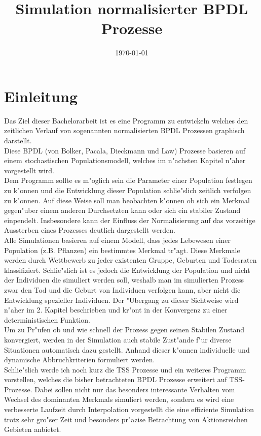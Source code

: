 \documentclass[11pt, a4paper, german]{article}
\date{\today}
\title{Simulation normalisierter BPDL Prozesse}
\begin{document}
\maketitle
\tableofcontents

\clearpage


\section{Einleitung}
Das Ziel dieser Bachelorarbeit ist es eine Programm zu entwickeln welches den zeitlichen Verlauf von sogenannten normalisierten BPDL Prozessen graphisch darstellt.\\
Diese BPDL (von Bolker, Pacala, Dieckmann und Law) Prozesse basieren auf einem stochastischen Populationsmodell, welches im n"achsten Kapitel n"aher vorgestellt wird. \\

Dem Programm sollte es m"oglich sein die Parameter einer Population festlegen zu k"onnen und die Entwicklung dieser Population schlie"slich zeitlich verfolgen zu k"onnen. Auf diese Weise soll man beobachten k"onnen ob sich ein Merkmal gegen"uber einem anderen Durchsetzten kann oder sich ein stabiler Zustand einpendelt. Insbesondere kann der Einfluss der Normalisierung auf das vorzeitige Aussterben eines Prozesses deutlich dargestellt werden.\\

Alle Simulationen basieren auf einem Modell, dass jedes Lebewesen einer Population (z.B. Pflanzen) ein bestimmtes Merkmal tr"agt. Diese Merkmale werden durch Wettbewerb zu jeder existenten Gruppe, Geburten und Todesraten klassifiziert. Schlie"slich ist es jedoch die Entwicklung der Population und nicht der Individuen die simuliert werden soll, weshalb man im simulierten Prozess zwar den Tod und die Geburt von Individuen verfolgen kann, aber nicht die Entwicklung spezieller Individuen. Der "Ubergang zu dieser Sichtweise wird n"aher im 2. Kapitel beschrieben und kr"ont in der Konvergenz zu einer deterministischen Funktion.\\

Um zu Pr"ufen ob und wie schnell der Prozess gegen seinen Stabilen Zustand konvergiert, werden in der Simulation auch stabile Zust"ande f"ur diverse Situationen automatisch dazu gestellt. Anhand dieser k"onnen individuelle und dynamische Abbruchkriterien formuliert werden.\\

Schlie"slich werde ich noch kurz die TSS Prozesse und ein weiteres Programm vorstellen, welches die bisher betrachteten BPDL Prozesse erweitert auf TSS-Prozesse. Dabei sollen nicht nur das besonders interessante Verhalten vom Wechsel des dominanten Merkmals simuliert werden, sondern es wird eine verbesserte Laufzeit durch Interpolation vorgestellt die eine effiziente Simulation trotz sehr gro"ser Zeit und besonders pr"azise Betrachtung von Aktionsreichen Gebieten anbietet.
\end{document}
